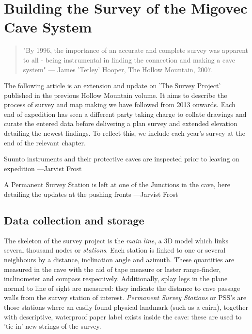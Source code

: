 \section{Building the Survey of the Migovec Cave System}

\begin{quote}
"By 1996, the importance of an accurate and complete survey was apparent to all - being instrumental  in finding the connection and making a cave system" --- James 'Tetley' Hooper, The Hollow Mountain, 2007. 
\end{quote}

The following article is an extension and update  on 'The Survey Project' published in the previous Hollow Mountain volume. It aims to describe the process of survey and map making we have followed from 2013 onwards. Each end of expedition has seen a different party taking charge to collate drawings and curate the entered data before delivering a plan survey and extended elevation detailing the newest findings. To reflect this, we include each year's survey at the end of the relevant chapter.

\begin{marginfigure}
\checkoddpage \ifoddpage \forcerectofloat \else \forceversofloat \fi
\centering
 \caption{Suunto instruments and their protective caves are inspected prior to leaving on expedition ---Jarvist Frost}
 \label{compass}
\end{marginfigure}

\begin{marginfigure}
\checkoddpage \ifoddpage \forcerectofloat \else \forceversofloat \fi
\centering
 \caption{A Permanent Survey Station is left at one of the Junctions in the cave, here detailing the updates at the pushing fronts ---Jarvist Frost}
 \label{PSS}
\end{marginfigure}


\subsection{Data collection and storage}
The skeleton of the survey project is the \emph{main line}, a 3D model which links several thousand nodes or \emph{stations}. Each station is linked to one or several neighbours by a distance, inclination angle and azimuth. These quantities are measured in the cave with the aid of tape measure or laster range-finder, inclinometer and compass respectively. Additionally, splay legs in the plane normal to line of sight are measured: they indicate the distance to cave passage walls from the survey station of interest. \emph{Permanent Survey Stations} or PSS's are those stations where an easily found physical landmark (such as a cairn), together with descriptive, waterproof paper label exists inside the cave: these are used to 'tie in' new strings of the survey.

